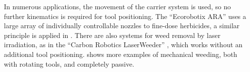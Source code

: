 \documentclass[runningheads]{llncs}
\begin{document}
In numerous applications, the movement of the carrier system is used, so no further kinematics is required for tool positioning. 
The ``Ecorobotix ARA'' \cite{Ecorobotix} uses a large array of individually controllable nozzles to fine-dose herbicides, a similar principle is applied in \cite{Utstumo2018}. 
There are also systems for weed removal by laser irradiation, as in the ``Carbon Robotics LaserWeeder'' \cite{CarbonRobotics}, which works without an additional tool positioning. 
\cite{Zhang2022} shows more examples of mechanical weeding, both with rotating tools, and completely passive. 
    
\end{document}
